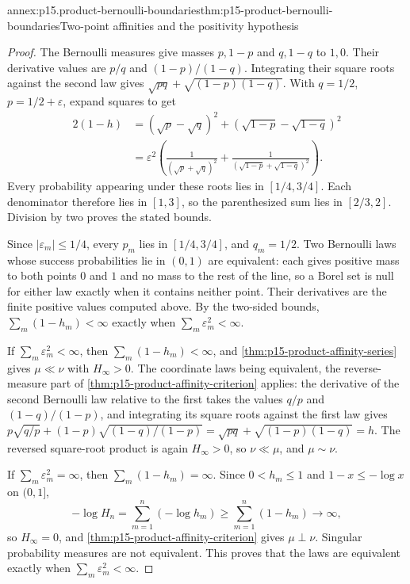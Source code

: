 \begin{annexitem}{annex:p15.product-bernoulli-boundaries}{thm:p15-product-bernoulli-boundaries}{Two-point affinities and the positivity hypothesis}
\begin{proof}
The Bernoulli measures give masses \(p,1-p\) and \(q,1-q\) to
\(1,0\). Their derivative values are \(p/q\) and
\((1-p)/(1-q)\). Integrating their square roots against the second
law gives \(\sqrt{pq}+\sqrt{(1-p)(1-q)}\).
With \(q=1/2\), \(p=1/2+\varepsilon\), expand squares to get
\[
 \begin{aligned}
 2(1-h)
   &=(\sqrt p-\sqrt q)^2
        +(\sqrt{1-p}-\sqrt{1-q})^2\\
   &=\varepsilon^2\left(
       \frac{1}{(\sqrt p+\sqrt q)^2}
       +\frac{1}{(\sqrt{1-p}+\sqrt{1-q})^2}\right).
 \end{aligned}
\]
Every probability appearing under these roots lies in \([1/4,3/4]\).
Each denominator therefore lies in \([1,3]\), so the parenthesized
sum lies in \([2/3,2]\).
Division by two proves the stated bounds.

Since \(|\varepsilon_m|\leq1/4\), every \(p_m\) lies in
\([1/4,3/4]\), and \(q_m=1/2\). Two Bernoulli laws whose success
probabilities lie in \((0,1)\) are equivalent: each gives positive mass
to both points \(0\) and \(1\) and no mass to the rest of the line, so
a Borel set is null for either law exactly when it contains neither
point. Their derivatives are the finite positive values computed above.
By the two-sided bounds, \(\sum_m(1-h_m)<\infty\) exactly when
\(\sum_m\varepsilon_m^2<\infty\).

If \(\sum_m\varepsilon_m^2<\infty\), then \(\sum_m(1-h_m)<\infty\), and
\cref{thm:p15-product-affinity-series} gives \(\mu\ll\nu\) with
\(H_\infty>0\). The coordinate laws being equivalent, the
reverse-measure part of \cref{thm:p15-product-affinity-criterion}
applies: the derivative of the second Bernoulli law relative to the
first takes the values \(q/p\) and \((1-q)/(1-p)\), and integrating its
square roots against the first law gives
\(p\sqrt{q/p}+(1-p)\sqrt{(1-q)/(1-p)}=\sqrt{pq}+\sqrt{(1-p)(1-q)}=h\).
The reversed square-root product is again \(H_\infty>0\), so
\(\nu\ll\mu\), and \(\mu\sim\nu\).

If \(\sum_m\varepsilon_m^2=\infty\), then \(\sum_m(1-h_m)=\infty\).
Since \(0<h_m\leq1\) and \(1-x\leq-\log x\) on \((0,1]\),
\[
 -\log H_n=\sum_{m=1}^n(-\log h_m)\geq\sum_{m=1}^n(1-h_m)
          \longrightarrow\infty,
\]
so \(H_\infty=0\), and \cref{thm:p15-product-affinity-criterion} gives
\(\mu\perp\nu\). Singular probability measures are not equivalent. This
proves that the laws are equivalent exactly when
\(\sum_m\varepsilon_m^2<\infty\).


\end{proof}
\end{annexitem}
